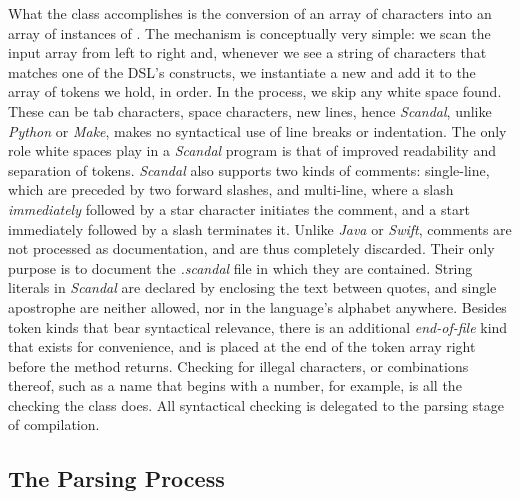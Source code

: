 What the  class accomplishes is the conversion of an array of characters into an array of instances of . The mechanism is conceptually very simple: we scan the input array from left to right and, whenever we see a string of characters that matches one of the DSL's constructs, we instantiate a new  and add it to the array of tokens we hold, in order. In the process, we skip any white space found. These can be tab characters, space characters, new lines, hence \emph{Scandal}, unlike \emph{Python} or \emph{Make}, makes no syntactical use of line breaks or indentation. The only role white spaces play in a \emph{Scandal} program is that of improved readability and separation of tokens. \emph{Scandal} also supports two kinds of comments: single-line, which are preceded by two forward slashes, and multi-line, where a slash \emph{immediately} followed by a star character initiates the comment, and a start immediately followed by a slash terminates it. Unlike \emph{Java} or \emph{Swift}, comments are not processed as documentation, and are thus completely discarded. Their only purpose is to document the \emph{.scandal} file in which they are contained. String literals in \emph{Scandal} are declared by enclosing the text between quotes, and single apostrophe are neither allowed, nor in the language's alphabet anywhere. Besides token kinds that bear syntactical relevance, there is an additional \emph{end-of-file} kind that exists for convenience, and is placed at the end of the token array right before the  method returns. Checking for illegal characters, or combinations thereof, such as a name that begins with a number, for example, is all the checking the  class does. All syntactical checking is delegated to the parsing stage of compilation.

\subsection{The Parsing Process}

